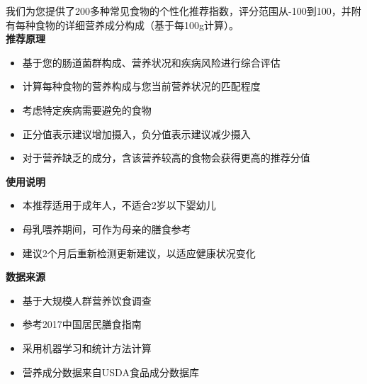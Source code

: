 \documentclass[UTF8]{ctexart}
\begin{document}
\begin{tcolorbox}[
    enhanced,
    colback=customTealBg,
    colframe=gray!3,
    arc=3mm,
    boxrule=0pt,
    width=\textwidth,
    top=8pt,
    bottom=8pt
]
{\small{\color{customTeal}\faInfoCircle} 我们为您提供了200多种常见食物的个性化推荐指数，评分范围从-100到100，并附有每种食物的详细营养成分构成（基于每100g计算）。\\

\textbf{推荐原理}
\begin{itemize}
    \item 基于您的肠道菌群构成、营养状况和疾病风险进行综合评估
    \item 计算每种食物的营养构成与您当前营养状况的匹配程度
    \item 考虑特定疾病需要避免的食物
    \item 正分值表示建议增加摄入，负分值表示建议减少摄入
    \item 对于营养缺乏的成分，含该营养较高的食物会获得更高的推荐分值
\end{itemize}
\textbf{使用说明}
\begin{itemize}
    \item 本推荐适用于成年人，不适合2岁以下婴幼儿
    \item 母乳喂养期间，可作为母亲的膳食参考
    \item 建议2个月后重新检测更新建议，以适应健康状况变化
\end{itemize}
\textbf{数据来源}
\begin{itemize}
    \item 基于大规模人群营养饮食调查
    \item 参考2017中国居民膳食指南
    \item 采用机器学习和统计方法计算
    \item 营养成分数据来自USDA食品成分数据库
\end{itemize}

}
\end{tcolorbox}

\newpage
\end{document}
